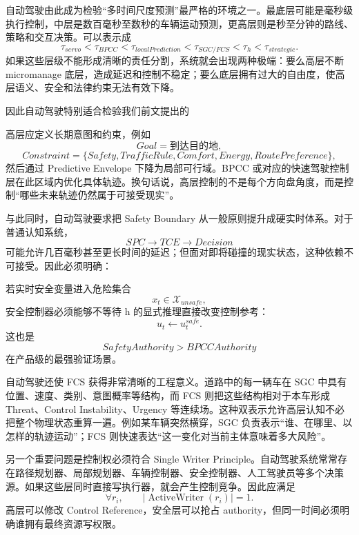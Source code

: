 自动驾驶由此成为检验“多时间尺度预测”最严格的环境之一。最底层可能是毫秒级执行控制，中层是数百毫秒至数秒的车辆运动预测，更高层则是秒至分钟的路线、策略和交互决策。可以表示成
\[
\tau_{servo}
<
\tau_{BPCC}
<
\tau_{localPrediction}
<
\tau_{SGC/FCS}
<
\tau_h
<
\tau_{strategic}.
\]
如果这些层级不能形成清晰的责任分割，系统就会出现两种极端：要么高层不断 micromanage 底层，造成延迟和控制不稳定；要么底层拥有过大的自由度，使高层语义、安全和法律约束无法有效下降。

因此自动驾驶特别适合检验我们前文提出的
\begin{statementbox}
\centering
{}
\end{statementbox}
高层应定义长期意图和约束，例如
\[
Goal=\text{到达目的地},
\]
\[
Constraint=
\{
Safety,
TrafficRule,
Comfort,
Energy,
RoutePreference
\},
\]
然后通过 Predictive Envelope 下降为局部可行域。BPCC 或对应的快速驾驶控制层在此区域内优化具体轨迹。换句话说，高层控制的不是每个方向盘角度，而是控制“哪些未来轨迹仍然属于可接受现实”。

与此同时，自动驾驶要求把 Safety Boundary 从一般原则提升成硬实时体系。对于普通认知系统，
\[
SPC
\rightarrow
TCE
\rightarrow
Decision
\]
可能允许几百毫秒甚至更长时间的延迟；但面对即将碰撞的现实状态，这种依赖不可接受。因此必须明确：
\begin{statementbox}
\centering
{}
\end{statementbox}
若实时安全变量进入危险集合
\[
x_t\in\mathcal{X}_{unsafe},
\]
安全控制器必须能够不等待 h 的显式推理直接改变控制参考：
\[
u_t
\leftarrow
u_t^{safe}.
\]
这也是
\[
SafetyAuthority
>
BPCCAuthority
\]
在产品级的最强验证场景。

自动驾驶还使 FCS 获得非常清晰的工程意义。道路中的每一辆车在 SGC 中具有位置、速度、类别、意图概率等结构，而 FCS 则把这些结构相对于本车形成 Threat、Control Instability、Urgency 等连续场。这种双表示允许高层认知不必把整个物理状态重算一遍。例如某车辆突然横穿，SGC 负责表示“谁、在哪里、以怎样的轨迹运动”；FCS 则快速表达“这一变化对当前主体意味着多大风险”。

另一个重要问题是控制权必须符合 Single Writer Principle。自动驾驶系统常常存在路径规划器、局部规划器、车辆控制器、安全控制器、人工驾驶员等多个决策源。如果这些层同时直接写执行器，就会产生控制竞争。因此应满足
\[
\forall r_i,\qquad
|\operatorname{ActiveWriter}(r_i)|=1.
\]
高层可以修改 Control Reference，安全层可以抢占 authority，但同一时间必须明确谁拥有最终资源写权限。

